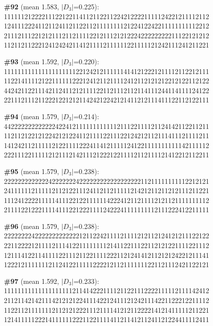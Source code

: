 \documentclass[10pt]{article}
\begin{document}
\noindent\textbf{\#92} (mean 1.583, $|D_3|$=0.225):\\
111111212222111221221141121122112242122221111124221211112112\\
124111222411211241121122112111111112122412242211111111112212\\
211121112212121112112111122121112121222422222222211122121212\\
112112112221241242421141211112111111221111121242111241211221\medskip

\noindent\textbf{\#93} (mean 1.592, $|D_3|$=0.220):\\
111111111111111111111221242121111114141212221211112112212111\\
112214111121221111112221241211211112412112121212212122112122\\
442421122111421124112121111221121112112114111244114111124122\\
221112111211222122121211424212242121411212111411122112122111\medskip

\noindent\textbf{\#94} (mean 1.579, $|D_3|$=0.214):\\
442222222222222422412111111111111211122111121124142112211211\\
112112122121224212122411211112211122124212112111411121111211\\
141242112111112122111122241141211111241221111111111142111112\\
222111221111121211121421112122212211112112111121412212112211\medskip

\noindent\textbf{\#95} (mean 1.579, $|D_3|$=0.238):\\
222222222222242222222422222222222222222211211111111112212121\\
241111112111112112122111241121121111121421211211212111211221\\
111241222211111411122122111111422241211211112121121111111112\\
211112212221111411122122211112422241111111112111222412211111\medskip

\noindent\textbf{\#96} (mean 1.579, $|D_3|$=0.238):\\
222222224222222222222212112242111121111212112124121211122122\\
221122221211112111412211111111214112211122112121221111221112\\
121114122114111122111211221111222112124141211212124221211141\\
122212111111121124122111112222121121111111221121112421122121\medskip

\noindent\textbf{\#97} (mean 1.592, $|D_3|$=0.233):\\
111111111111111111112114142221111211221112222111112111142412\\
211211421421114212121224111422124111212421114221122212211112\\
112211211111112112121222111211114121211222214121411111211221\\
121411111222141111112221122111141121141211241121224411112411\medskip
\end{document}
